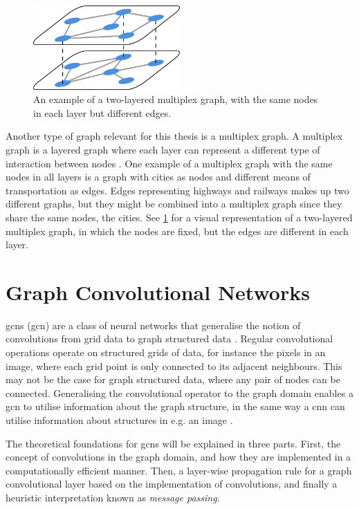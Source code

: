 \begin{figure}[!htbp]
    \centering
    \includegraphics[width=0.5\textwidth]{chapters/images_theory/multiplex_graph.png}
    \caption{An example of a two-layered multiplex graph, with the same nodes in each layer but different edges.}
    \label{fig:multiplex_graph}
\end{figure}
Another type of graph relevant for this thesis is a multiplex graph. A multiplex graph is a layered graph where each layer can represent a different type of interaction between nodes \cite{multiplex_book_chap2}. One example of a multiplex graph with the same nodes in all layers is a graph with cities as nodes and different means of transportation as edges. Edges representing highways and railways makes up two different graphs, but they might be combined into a multiplex graph since they share the same nodes, the cities. See \cref{fig:multiplex_graph} for a visual representation of a two-layered multiplex graph, in which the nodes are fixed, but the edges are different in each layer.

\section{Graph Convolutional Networks}
\label{sec:gcn}

\acrlong{gcn}s (\acrshort{gcn}) are a class of neural networks that generalise the notion of convolutions from grid data to graph structured data \cite{wu_review}. Regular convolutional operations operate on structured grids of data, for instance the pixels in an image, where each grid point is only connected to its adjacent neighbours. This may not be the case for graph structured data, where any pair of nodes can be connected. Generalising the convolutional operator to the graph domain enables a \acrshort{gcn} to utilise information about the graph structure, in the same way a \acrshort{cnn} can utilise information about structures in e.g. an image \cite{wu_review}.

The theoretical foundations for \acrshort{gcn}s will be explained in three parts. First, the concept of convolutions in the graph domain, and how they are implemented in a computationally efficient manner. Then, a layer-wise propagation rule for a graph convolutional layer based on the implementation of convolutions, and finally a heuristic interpretation known as \textit{message passing}.

